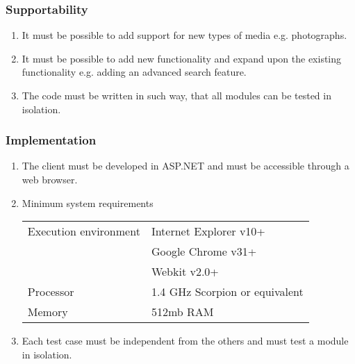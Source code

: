 \documentclass[../report.tex]{subfiles}
\begin{document}
\subsubsection{Supportability}

\begin{enumerate}[label=\textbf{NFR-\twodigits*}, resume]
\item It must be possible to add support for new types of media e.g. photographs.
\item It must be possible to add new functionality and expand upon the existing functionality e.g. adding an advanced search feature.
\item The code must be written in such way, that all modules can be tested in isolation.
\end{enumerate}

\subsubsection{Implementation}
\begin{enumerate}[label=\textbf{NFR-\twodigits*}, resume]
\item The client must be developed in ASP.NET and must be accessible through a web browser.
\item Minimum system requirements


\begin{tabular}{| l | l | }
\hline
 Execution environment & Internet Explorer v10+\\
& Google Chrome v31+\\
& Webkit v2.0+\\ \hline
 Processor & 1.4 GHz Scorpion or equivalent \\ \hline
 Memory & 512mb RAM  \\ \hline

\end{tabular}

\item Each test case must be independent from the others and must test a module in isolation.
\end{enumerate}


\end{document}
